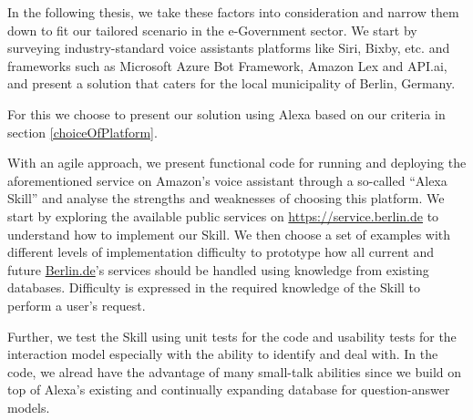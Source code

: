 In the following thesis, we take these factors into consideration and narrow them down to fit our tailored scenario in the e-Government sector. We start by surveying industry-standard %
voice assistants platforms like Siri, Bixby, etc. and frameworks such as Microsoft Azure Bot Framework, Amazon Lex and API.ai,
and present a solution that caters for the local municipality of Berlin, Germany.

For this we choose to present our solution using Alexa based on our criteria in section \ref{choiceOfPlatform}.

With an agile approach, we present functional code for running and deploying the aforementioned service on Amazon's voice assistant through a so-called ``Alexa Skill'' and analyse the strengths and weaknesses of choosing this platform. We start by exploring the available public services on \href{https://service.berlin.de}{https://service.berlin.de} 
to understand how to implement our Skill. 
We then choose a set of examples with different levels of implementation difficulty to prototype how all current and future \href{https://service.berlin.de}{Berlin.de}'s 
services should be handled using knowledge from existing databases.
Difficulty is expressed in the required knowledge of the Skill to perform a user's request. 

Further, we test the Skill using unit tests for the code and usability tests for the interaction model especially with the ability to identify and deal with.
In the code, we alread have the advantage of many small-talk abilities since we build on top of Alexa's existing and continually expanding database for question-answer models.

